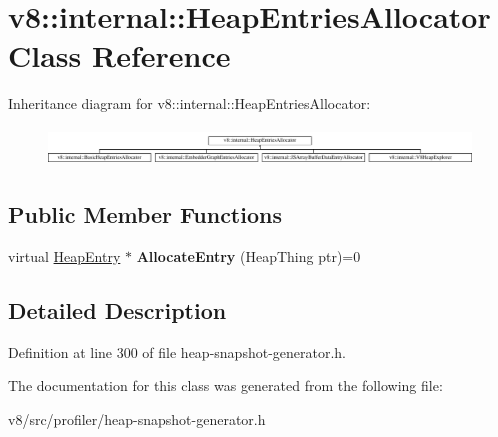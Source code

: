 \hypertarget{classv8_1_1internal_1_1HeapEntriesAllocator}{}\section{v8\+:\+:internal\+:\+:Heap\+Entries\+Allocator Class Reference}
\label{classv8_1_1internal_1_1HeapEntriesAllocator}
Inheritance diagram for v8\+:\+:internal\+:\+:Heap\+Entries\+Allocator\+:\begin{figure}[H]
\begin{center}
\leavevmode
\includegraphics[height=1.007194cm]{classv8_1_1internal_1_1HeapEntriesAllocator}
\end{center}
\end{figure}
\subsection*{Public Member Functions}
\begin{DoxyCompactItemize}
\item 
\mbox{\label{classv8_1_1internal_1_1HeapEntriesAllocator_a50db4f7564a26290843caffad619edbb}} 
virtual \mbox{\hyperlink{classv8_1_1internal_1_1HeapEntry}{Heap\+Entry}} $\ast$ {\bfseries Allocate\+Entry} (Heap\+Thing ptr)=0
\end{DoxyCompactItemize}


\subsection{Detailed Description}


Definition at line 300 of file heap-\/snapshot-\/generator.\+h.



The documentation for this class was generated from the following file\+:\begin{DoxyCompactItemize}
\item 
v8/src/profiler/heap-\/snapshot-\/generator.\+h\end{DoxyCompactItemize}
